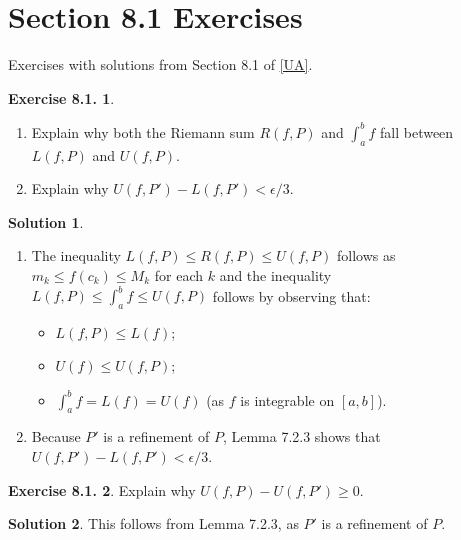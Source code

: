 \documentclass[12pt]{article}
\theoremstyle{definition}
\theoremstyle{exercise}
\newtheorem{exercise}{Exercise 8.1.}
\theoremstyle{solution}
\newtheorem*{solution}{Solution}
\begin{document}
\section{Section 8.1 Exercises}

Exercises with solutions from Section 8.1 of \hyperlink{ua}{[UA]}.

\begin{exercise}
\label{ex:1}
    \begin{enumerate}
        \item Explain why both the Riemann sum \( R(f, P) \) and \( \int_a^b f \) fall between \( L(f, P) \) and \( U(f, P) \).

        \item Explain why \( U(f, P') - L(f, P') < \epsilon/3 \).
    \end{enumerate}
\end{exercise}

\begin{solution}
    \begin{enumerate}
        \item The inequality \( L(f, P) \leq R(f, P) \leq U(f, P) \) follows as \( m_k \leq f(c_k) \leq M_k \) for each \( k \) and the inequality \( L(f, P) \leq \int_a^b f \leq U(f, P) \) follows by observing that:
        \begin{itemize}
            \item \( L(f, P) \leq L(f) \);

            \item \( U(f) \leq U(f, P) \);

            \item \( \int_a^b f = L(f) = U(f) \) (as \( f \) is integrable on \( [a, b] \)).
        \end{itemize}

        \item Because \( P' \) is a refinement of \( P \), Lemma 7.2.3 shows that \( U(f, P') - L(f, P') < \epsilon/3 \).
    \end{enumerate}
\end{solution}

\begin{exercise}
\label{ex:2}
    Explain why \( U(f, P) - U(f, P') \geq 0 \).
\end{exercise}

\begin{solution}
    This follows from Lemma 7.2.3, as \( P' \) is a refinement of \( P \).
\end{solution}
\end{document}
